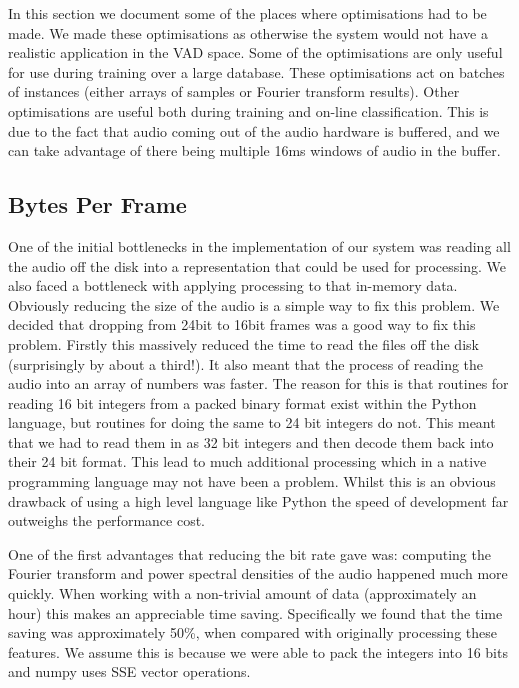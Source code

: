 \documentclass[ %
                    author={Sam Phippen},
                supervisor={Dr. Rafal Bogacz},
                     title={Real time voice activity detectors in noisy personal computing environments},
                  subtitle={},
                    degree={MEng},
                      year={2012} ]{thesis}
\begin{document}
In this section we document some of the places where optimisations had to be
made. We made these optimisations as otherwise the system would not have a
realistic application in the VAD space. Some of the optimisations are only
useful for use during training over a large database. These optimisations act
on batches of instances (either arrays of samples or Fourier transform
results). Other optimisations are useful both during training and on-line
classification. This is due to the fact that audio coming out of the audio
hardware is buffered, and we can take advantage of there being multiple 16ms
windows of audio in the buffer.

\subsection{Bytes Per Frame}

One of the initial bottlenecks in the implementation of our system was reading
all the audio off the disk into a representation that could be used for
processing. We also faced a bottleneck with applying processing to that
in-memory data. Obviously reducing the size of the audio is a simple way to fix
this problem. We decided that dropping from 24bit to 16bit frames was a good
way to fix this problem. Firstly this massively reduced the time to read the
files off the disk (surprisingly by about a third!). It also meant that the
process of reading the audio into an array of numbers was faster. The reason
for this is that routines for reading 16 bit integers from a packed binary
format exist within the Python language, but routines for doing the same to 24
bit integers do not. This meant that we had to read them in as 32 bit integers
and then decode them back into their 24 bit format. This lead to much
additional processing which in a native programming language may not have been
a problem. Whilst this is an obvious drawback of using a high level language
like Python the speed of development far outweighs the performance cost.

One of the first advantages that reducing the bit rate gave was: computing the
Fourier transform and power spectral densities of the audio happened much more
quickly. When working with a non-trivial amount of data (approximately an hour)
this makes an appreciable time saving. Specifically we found that the time
saving was approximately 50\%, when compared with originally processing these
features. We assume this is because we were able to pack the integers into 16
bits and numpy uses SSE vector operations.
\end{document}

